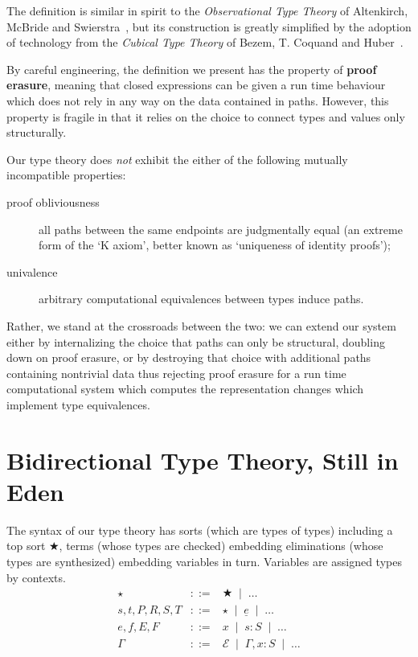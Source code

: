 \documentclass{sigplanconf}
\newcommand{\hb}{\!:\!}
\begin{document}
The definition is similar in spirit to the \emph{Observational
Type Theory} of Altenkirch, McBride and
Swierstra~\cite{DBLP:conf/plpv/AltenkirchMS07},
but its construction is greatly simplified by the adoption of
technology from the \emph{Cubical Type Theory} of Bezem, T. Coquand
and Huber~\cite{DBLP:conf/types/BezemCH13}.

By careful engineering, the definition we present has the property
of \textbf{proof erasure}, meaning that closed expressions can be
given a run time behaviour which does not rely in any way on the
data contained in paths. However, this property is
fragile in that it relies on the choice to connect types and
values only structurally.

Our type theory does \emph{not} exhibit the either of the following
mutually incompatible properties:
\begin{description}
\item[proof obliviousness] all paths between the same endpoints are
  judgmentally equal (an extreme form of the `K axiom', better known
  as `uniqueness of identity proofs');
\item[univalence] arbitrary computational equivalences between types induce paths.
\end{description}
Rather, we stand at the crossroads between the two: we can extend our
system either by internalizing the choice that paths can only be
structural, doubling down on proof erasure, or by destroying that
choice with additional paths containing nontrivial data thus
rejecting proof erasure for a run time computational system which
computes the representation changes which implement type equivalences.


\section{Bidirectional Type Theory, Still in Eden}

\newcommand{\gs}{\;\mid\;}
\newcommand{\neu}{\underline}
\newcommand{\TYPE}{\bigstar}
\newcommand{\EC}{\mathcal{E}}

The syntax of our type theory has sorts (which are types of types)
including a top sort $\TYPE$,
terms (whose types are checked) embedding eliminations (whose types are
synthesized) embedding variables in turn. Variables are assigned types by contexts.
\[\begin{array}{rrl}
\star & ::= & \TYPE \gs \ldots \\
s,t,P,R,S,T & ::= & \star \gs \neu e \gs \ldots \\
e,f,E,F & ::= & x \gs s\hb S \gs \ldots \\
\Gamma & ::= & \EC \gs \Gamma,x\hb S \gs \ldots
\end{array}\]
\end{document}
